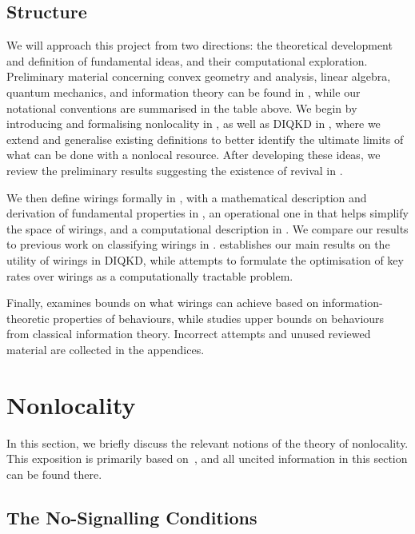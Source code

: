 \documentclass[10pt, a4paper]{article}
\numberwithin{equation}{section} %
\theoremstyle{definition}
\theoremstyle{plain}
\newcommand{\?}{\mathrel{?}} %
\begin{document}
    \subsection{Structure}

    We will approach this project from two directions: the theoretical development and definition of fundamental ideas, and their computational exploration. Preliminary material concerning convex geometry and analysis, linear algebra, quantum mechanics, and information theory can be found in , while our notational conventions are summarised in the table above. We begin by introducing and formalising nonlocality in , as well as DIQKD in , where we extend and generalise existing definitions to better identify the ultimate limits of what can be done with a nonlocal resource. After developing these ideas, we review the preliminary results suggesting the existence of revival in .

    We then define wirings formally in , with a mathematical description and derivation of fundamental properties in , an operational one in  that helps simplify the space of wirings, and a computational description in . We compare our results to previous work on classifying wirings in .  establishes our main results on the utility of wirings in DIQKD, while  attempts to formulate the optimisation of key rates over wirings as a computationally tractable problem.

    Finally,  examines bounds on what wirings can achieve based on information-theoretic properties of behaviours, while  studies upper bounds on behaviours from classical information theory. Incorrect attempts and unused reviewed material are collected in the appendices.

    \section{Nonlocality}\label{sec:nl}

    In this section, we briefly discuss the relevant notions of the theory of nonlocality. This exposition is primarily based on~\cite{BellNonlocality}, and all uncited information in this section can be found there.

    \subsection{The No-Signalling Conditions}\label{sec:nl_ns}
\end{document}
